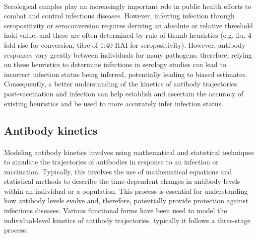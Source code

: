 \documentclass{article}
\begin{document}
\paragraph{}Serological samples play an increasingly important role in public health efforts to combat and control infectious diseases.\cite{Haselbeck2022;Metcalfe2015} However, inferring infection through seropositivity or seroconversion requires deriving an absolute or relative threshold hold value, and these are often determined by rule-of-thumb heuristics (e.g. flu, 4-fold-rise for conversion, titre of 1:40 HAI for seropositivity).\cite{Xu2020} However, antibody responses vary greatly between individuals for many pathogens; therefore, relying on these heuristics to determine infections in serology studies can lead to incorrect infection status being inferred, potentially leading to biased estimates.\cite{Chan2021;Cauchesmez2021} Consequently, a better understanding of the kinetics of antibody trajectories post-vaccination and infection can help establish and ascertain the accuracy of existing heuristics and be used to more accurately infer infection status.

\subsection{Antibody kinetics}

\paragraph{}Modeling antibody kinetics involves using mathematical and statistical techniques to simulate the trajectories of antibodies in response to an infection or vaccination. \cite{Hay2023} Typically, this involves the use of mathematical equations and statistical methods to describe the time-dependent changes in antibody levels within an individual or a population. This process is essential for understanding how antibody levels evolve and, therefore, potentially provide protection against infectious diseases. Various functional forms have been used to model the individual-level kinetics of antibody trajectories,\cite{} typically it follows a three-stage process:
\end{document}

